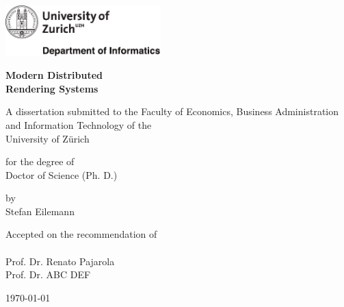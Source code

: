 

\begin{titlepage}

\setlength{\parindent}{0pt} %

\includegraphics[width=6cm]{front/images/uzhlogo.pdf}

\vspace{-2.25cm}

\begingroup
{}

\vspace{-0.75cm}
\Large
\textbf{Modern Distributed\\Rendering Systems}

\vspace{0.70cm}

\normalsize
A dissertation submitted to the Faculty of Economics,
Business Administration and Information Technology of the\\ University of Z\"urich\\

\vspace{0.70cm}

for the degree of\\
Doctor of Science (Ph. D.)

\vspace{0.70cm}

by\\
Stefan Eilemann

\vspace{3.7cm}

Accepted on the recommendation of \\
\\
Prof. Dr. Renato Pajarola\\
Prof. Dr. ABC DEF

\vspace{2.2cm}
\today

\vspace{2.2cm}

\endgroup

\end{titlepage}
